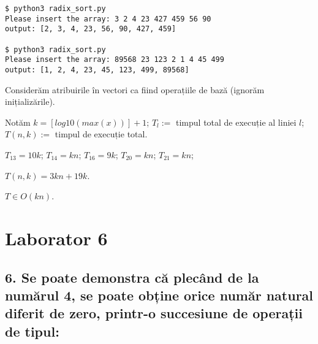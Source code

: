 \documentclass[11pt]{article}
\begin{document}
\begin{verbatim}
$ python3 radix_sort.py
Please insert the array: 3 2 4 23 427 459 56 90
output: [2, 3, 4, 23, 56, 90, 427, 459]

$ python3 radix_sort.py
Please insert the array: 89568 23 123 2 1 4 45 499
output: [1, 2, 4, 23, 45, 123, 499, 89568]
\end{verbatim}


Considerăm atribuirile în vectori ca fiind operațiile de bază (ignorăm inițializările).

Notăm $k = [\mathit{log10}(\mathit{max}(x))] + 1$; $T_l := $ timpul total de execuție al liniei $l$; $T(n, k) :=$ timpul de execuție total.

$T_{13} = 10 k$;
$T_{14} = k n$;
$T_{16} = 9 k$;
$T_{20} = k n$;
$T_{21} = k n$;

$T(n, k) = 3kn + 19k$.

\vspace{7pt}
$T \in O(kn)$.

\section*{Laborator 6}
\label{sec:org3e062d4}
\subsection*{6. Se poate demonstra că plecând de la numărul 4, se poate obține orice număr natural diferit de zero, printr-o succesiune de operații de tipul:}
\label{sec:org5b9fb7a}
\end{document}
